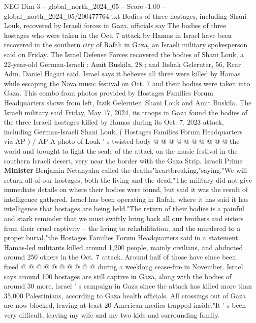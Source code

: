 \begin{textsample}{NEG Dim 3 – global\_north\_2024\_05 – Score -1.00 – global\_north\_2024\_05/200477764.txt}  \label{ex:f3_neg_445}
Bodies of three hostages, including Shani Louk, recovered by Israeli forces in Gaza, officials say The bodies of three hostages who were taken in the Oct. 7 attack by Hamas in Israel have been recovered in the southern city of Rafah in Gaza, an Israeli military spokesperson said on Friday.
The Israel Defense Forces recovered the bodies of Shani Louk, a 22-year-old German-Israeli ; Amit Buskila, 28 ; and Itshak Gelernter, 56, Rear Adm.
Daniel Hagari said.
Israel says it believes all three were killed by Hamas while escaping the Nova music festival on Oct. 7 and their bodies were taken into Gaza.
This combo from photos provided by Hostages Families Forum Headquarters shows from left, Itzik Gelernter, Shani Louk and Amit Buskila.
The Israeli military said Friday, May 17, 2024, its troops in Gaza found the bodies of the three Israeli hostages killed by Hamas during its Oct. 7, 2023 attack, including German-Israeli Shani Louk. ( Hostages Families Forum Headquarters via AP ) / AP A photo of Louk ' s twisted body @ @ @ @ @ @ @ @ @ @ the world and brought to light the scale of the attack on the music festival in the southern Israeli desert, very near the border with the Gaza Strip.
Israeli Prime \textbf{Minister} Benjamin Netanyahu called the deaths"heartbreaking,"saying,"We will return all of our hostages, both the living and the dead."The military did not give immediate details on where their bodies were found, but said it was the result of intelligence gathered.
Israel has been operating in Rafah, where it has said it has intelligence that hostages are being held."The return of their bodies is a painful and stark reminder that we must swiftly bring back all our brothers and sisters from their cruel captivity -- the living to rehabilitation, and the murdered to a proper burial,"the Hostages Families Forum Headquarters said in a statement.
Hamas-led militants killed around 1,200 people, mainly civilians, and abducted around 250 others in the Oct. 7 attack.
Around half of those have since been freed @ @ @ @ @ @ @ @ @ @ during a weeklong cease-fire in November.
Israel says around 100 hostages are still captive in Gaza, along with the bodies of around 30 more.
Israel ' s campaign in Gaza since the attack has killed more than 35,000 Palestinians, according to Gaza health officials.
All crossings out of Gaza are now blocked, leaving at least 20 American medics trapped inside."It ' s been very difficult, leaving my wife and my two kids and surrounding family.

\end{textsample}
